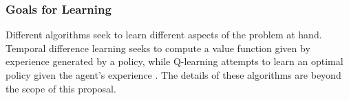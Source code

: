 \subsubsection{Goals for Learning}
Different algorithms seek to learn different aspects of the problem at hand.  Temporal difference learning seeks to compute a value function given by experience generated by a policy, while Q-learning attempts to learn an optimal policy given the agent's experience \cite{lizotte2017reinforcement}.  The details of these algorithms are beyond the scope of this proposal.